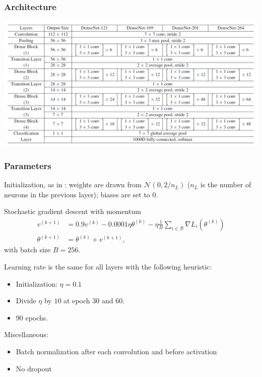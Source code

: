 \begin{frame}
	\frametitle{Architecture}

	\begin{center}
		\includegraphics[scale=0.65]{figs/densenet_architecture}
	\end{center}
\end{frame}




\begin{frame}
\frametitle{Parameters}

Initialization, as in \cite{he2015delving}: weights are drawn from $\mathcal{N}(0, 2/n_L)$ ($n_L$ is the number of neurons in the previous layer); biases are set to $0$.


\begin{block}{Stochastic gradient descent with momentum}
	\begin{align*}
	v^{(k+1)} & = 0.9 v^{(k)} - 0.0001 \eta \theta^{(k)} - \eta \frac{1}{B} \sum_{i \in \mathcal{B}} \nabla L_i (\theta^{(k)})\\
	\theta^{(k+1)} & = \theta^{(k)} + v^{(k+1)},
	\end{align*}
	with batch size $B= 256$.
\end{block}



Learning rate is the same for all layers with the following heuristic:
\begin{itemize}
	\item Initialization: $\eta = 0.1$
	\item Divide $\eta$ by $10$ at epoch $30$ and $60$.
	\item $90$ epochs.
\end{itemize}

Miscellaneous:
\begin{itemize}
	\item Batch normalization after each convolution and before activation
	\item No dropout
\end{itemize}
\end{frame}

